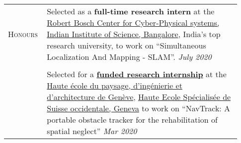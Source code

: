 \documentclass[letterpaper, 10pt, oneside]{article}
\newcommand{\stitle}[1]{\normalsize{\textsc{#1}}}
\begin{document}
\begin{longtable}{@{} p{0.13\linewidth} p{0.8\linewidth}}
  \stitle{Honours}

                       & Selected as a \textbf{full-time research intern} at the
  \href{https://cps.iisc.ac.in/}{Robert Bosch Center for Cyber-Physical systems, Indian Institute of Science, Bangalore}, India's top research university, to work on
  ``Simultaneous Localization And Mapping - SLAM''.
  \hfill \textsl{July 2020}                                                                                                                                                                        \\
  \\[-1ex]

                       & Selected for a \href{https://drive.google.com/file/d/1Rtlu6aHQKXntWhfEUcgB5tuNYMuvH04b}{\textbf{funded research internship}}
  at the \href{https://www.hesge.ch/hepia/}{Haute école du paysage, d'ingénierie et d'architecture de Genève}, \href{https://www.hesge.ch/geneve}{Haute Ecole Spécialisée de Suisse occidentale, Geneva}
  to work on ``NavTrack: A portable obstacle tracker for the rehabilitation of spatial neglect''           \hfill \textsl{Mar 2020}                                                                \\
\end{longtable}
\end{document}
